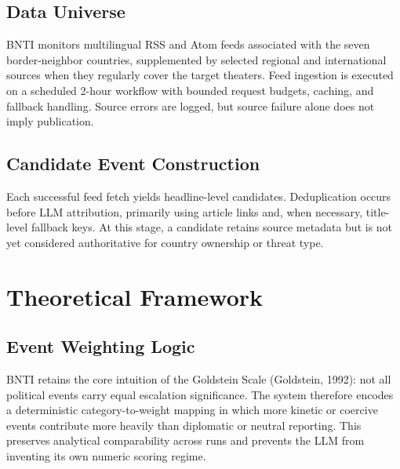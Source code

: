 \documentclass[11pt, a4paper]{article}
\begin{document}
\subsection{Data Universe}
BNTI monitors multilingual RSS and Atom feeds associated with the seven border-neighbor countries, supplemented by selected regional and international sources when they regularly cover the target theaters. Feed ingestion is executed on a scheduled 2-hour workflow with bounded request budgets, caching, and fallback handling. Source errors are logged, but source failure alone does not imply publication.

\subsection{Candidate Event Construction}
Each successful feed fetch yields headline-level candidates. Deduplication occurs before LLM attribution, primarily using article links and, when necessary, title-level fallback keys. At this stage, a candidate retains source metadata but is not yet considered authoritative for country ownership or threat type.

\section{Theoretical Framework}

\subsection{Event Weighting Logic}
BNTI retains the core intuition of the Goldstein Scale (Goldstein, 1992): not all political events carry equal escalation significance. The system therefore encodes a deterministic category-to-weight mapping in which more kinetic or coercive events contribute more heavily than diplomatic or neutral reporting. This preserves analytical comparability across runs and prevents the LLM from inventing its own numeric scoring regime.
\end{document}

